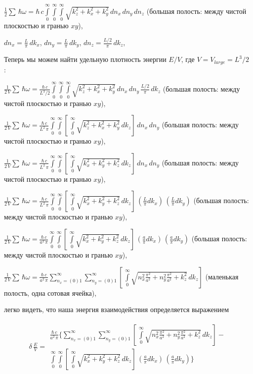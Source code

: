 \documentclass[11pt]{article}
\begin{document}
    \(\frac{1}{2}\sum\,\hbar\omega = \hbar\,c\int\limits_{0}^{\infty}\int\limits_{0}^{\infty}\int\limits_{0}^{\infty}\sqrt{k_z^2+k_x^2+k_y^2}\,d{n_x}\,d{n_y}\,d{n_z}\)
(большая полость: между чистой плоскостью и гранью \(xy\)),

    \(dn_x = \frac{L}{\pi}\,dk_x\), \(dn_y = \frac{L}{\pi}\,dk_y\),
\(dn_z = \frac{L/2}{\pi}\,dk_z\),

    Теперь мы можем найти удельную плотность энергии \(E/V\), где
\(V = V_{large} = L^3/2\) :

    \(\frac{1}{2\,V}\sum\,\hbar\omega = \frac{\hbar\,c}{L^3/2}\int\limits_{0}^{\infty}\int\limits_{0}^{\infty}\int\limits_{0}^{\infty}\sqrt{k_z^2+k_x^2+k_y^2}\,dn_x\,dn_y\,\frac{L/2}{\pi}\,dk_z\)
(большая полость: между чистой плоскостью и гранью \(xy\)),

    \(\frac{1}{2\,V}\sum\,\hbar\omega = \frac{\hbar\,c}{L^2\,\pi}\int\limits_{0}^{\infty}\int\limits_{0}^{\infty}\left[\,\int\limits_{0}^{\infty}\sqrt{k_z^2+k_x^2+k_y^2}\,dk_z\right]\,dn_x\,dn_y\)
(большая полость: между чистой плоскостью и гранью \(xy\)),

    \(\frac{1}{2\,V}\sum\,\hbar\omega = \frac{\hbar\,c}{L^2\,\pi}\int\limits_{0}^{\infty}\int\limits_{0}^{\infty}\left[\,\int\limits_{0}^{\infty}\sqrt{k_x^2+k_y^2+k_z^2}\,dk_z\right]\,dn_x\,dn_y\)
(большая полость: между чистой плоскостью и гранью \(xy\)),

    \(\frac{1}{2\,V}\sum\,\hbar\omega = \frac{\hbar\,c}{L^2\,\pi}\int\limits_{0}^{\infty}\int\limits_{0}^{\infty}\left[\,\int\limits_{0}^{\infty}\sqrt{k_x^2+k_y^2+k_z^2}\,dk_z\right]\,\left(\frac{L}{\pi}dk_x\right)\,\left(\frac{L}{\pi}dk_y\right)\)
(большая полость: между чистой плоскостью и гранью \(xy\)),

    \(\frac{1}{2\,V}\sum\,\hbar\omega = \frac{\hbar\,c}{a^2\,\pi}\int\limits_{0}^{\infty}\int\limits_{0}^{\infty}\left[\,\int\limits_{0}^{\infty}\sqrt{k_x^2+k_y^2+k_z^2}\,dk_z\right]\,\left(\frac{a}{\pi}dk_x\right)\,\left(\frac{a}{\pi}dk_y\right)\)
(большая полость: между чистой плоскостью и гранью \(xy\)),

    \(\frac{1}{2\,V}\sum\,\hbar\omega = \frac{\hbar\,c}{a^2\,\pi}\sum\limits_{n_x=(0)1}^{\infty}\sum\limits_{n_y=(0)1}^{\infty}\left[\,\int\limits_{0}^{\infty}\sqrt{n_x^2\frac{\pi^2}{a^2}+n_y^2\frac{\pi^2}{a^2}+k_z^2}\,dk_z\right]\)
(маленькая полость, одна сотовая ячейка),

    легко видеть, что наша энергия взаимодействия определяется выражением

    \[\begin{array}{lr}
\delta\,\frac{E}{V} = 
\begin{array}{c}
\frac{\hbar\,c}{a^2\,\pi}\Bigg\{\sum\limits_{n_x=(0)1}^{\infty}\sum\limits_{n_y=(0)1}^{\infty}\left[\,\int\limits_{0}^{\infty}\sqrt{n_x^2\frac{\pi^2}{a^2}+n_y^2\frac{\pi^2}{a^2}+k_z^2}\,dk_z\right] - \\
\int\limits_{0}^{\infty}\int\limits_{0}^{\infty}\left[\,\int\limits_{0}^{\infty}\sqrt{k_x^2+k_y^2+k_z^2}\,dk_z\right]\,\left(\frac{a}{\pi}dk_x\right)\,\left(\frac{a}{\pi}dk_y\right)\Bigg\}
\end{array}\end{array}\]
\end{document}
